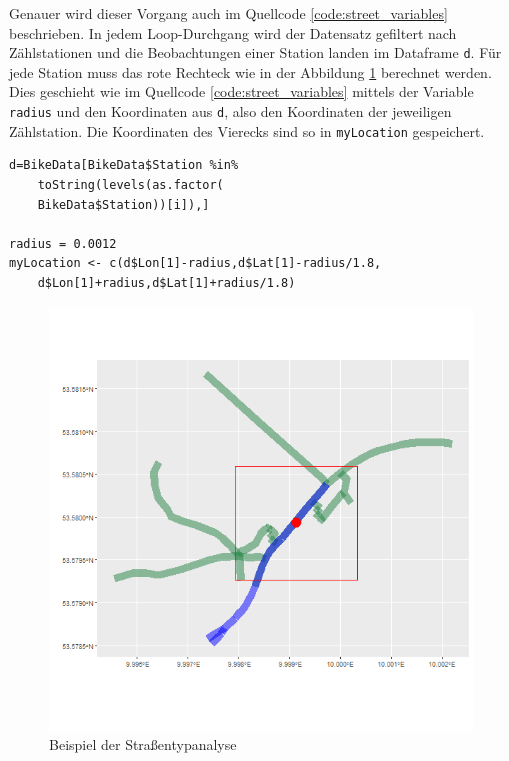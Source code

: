 \documentclass[a4paper,12pt]{thesis}
\begin{document}
Genauer wird dieser Vorgang auch im Quellcode \ref{code:street_variables} beschrieben. In jedem Loop-Durchgang wird der Datensatz gefiltert nach Zählstationen und die Beobachtungen einer Station landen im Dataframe \lstinline|d|. Für jede Station muss das rote Rechteck wie in der Abbildung \ref{Straßencheck} berechnet werden. Dies geschieht wie im Quellcode \ref{code:street_variables} mittels der Variable \lstinline|radius| und den Koordinaten aus \lstinline|d|, also den Koordinaten der jeweiligen Zählstation. Die Koordinaten des Vierecks sind so in \lstinline|myLocation| gespeichert.

\begin{minipage}{\linewidth}
\begin{lstlisting}[caption={Berechnung der Straßenvariablen},label=code:street_variables]
d=BikeData[BikeData$Station %in% 
	toString(levels(as.factor(
	BikeData$Station))[i]),]

radius = 0.0012
myLocation <- c(d$Lon[1]-radius,d$Lat[1]-radius/1.8,   
	d$Lon[1]+radius,d$Lat[1]+radius/1.8)
\end{lstlisting}
\end{minipage}

\begin{figure}[!ht]
	\centering
	\includegraphics[width=\textwidth]{Plots/Station_5564_1.png}
	\caption{Beispiel der Straßentypanalyse}
	\label{Straßencheck}
\end{figure}
\end{document}
